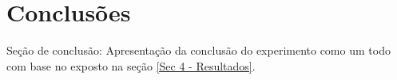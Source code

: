 \documentclass[letterpaper, 12pt]{article}
\begin{document}
\section{Conclusões}\label{Sec 5 - Conclusão}
Seção de conclusão: Apresentação da conclusão do experimento como um todo com base no exposto na seção \ref{Sec 4 - Resultados}.



\begin{thebibliography}{100}
\bibitem{}

\end{thebibliography}
\end{document}
